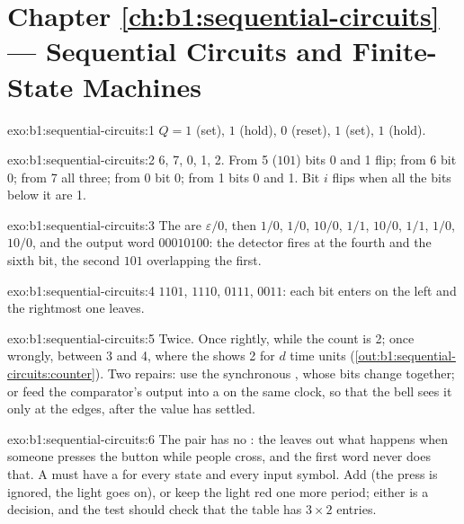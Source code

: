 \section*{Chapter \ref{ch:b1:sequential-circuits} --- Sequential Circuits and Finite-State Machines}

\begin{solution}{exo:b1:sequential-circuits:1}
$Q = 1$ (set), $1$ (hold), $0$ (reset), $1$ (set), $1$ (hold).
\end{solution}

\begin{solution}{exo:b1:sequential-circuits:2}
6, 7, 0, 1, 2. From 5 ($101$) bits 0 and 1 flip; from 6 bit 0; from 7 all three; from 0 bit 0; from 1 bits 0 and 1. Bit
$i$ flips when all the bits below it are 1.
\end{solution}

\begin{solution}{exo:b1:sequential-circuits:3}
The  are $\varepsilon/0$, then $1/0$, $1/0$, $10/0$, $1/1$, $10/0$, $1/1$, $1/0$, $10/0$, and the output word
$00010100$: the detector fires at the fourth and the sixth bit, the second $101$ overlapping the first.
\end{solution}

\begin{solution}{exo:b1:sequential-circuits:4}
$1101$, $1110$, $0111$, $0011$: each bit enters on the left and the rightmost one leaves.
\end{solution}

\begin{solution}{exo:b1:sequential-circuits:5}
Twice. Once rightly, while the count is 2; once wrongly, between 3 and 4, where the  shows 2 for $d$ time units
(\cref{out:b1:sequential-circuits:counter}). Two repairs: use the synchronous , whose bits change together; or feed
the comparator's output into a  on the same clock, so that the bell sees it only at the edges, after the value
has settled.
\end{solution}

\begin{solution}{exo:b1:sequential-circuits:6}
The pair  has no : the  leaves out what happens when someone presses the button
while people cross, and the first word never does that. A  must have a  for every state and
every input symbol. Add  (the press is ignored, the light goes on), or keep the light red one
more period; either is a decision, and the test should check that the table has $3 \times 2$ entries.
\end{solution}

